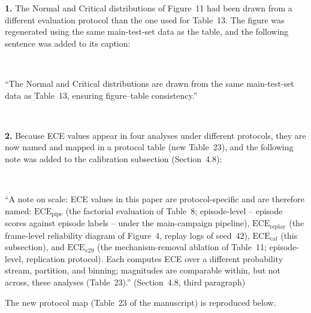 \documentclass[1p,12pt,authoryear]{elsarticle}
\begin{document}
\vspace{2mm}
\noindent \textbf{1.} The Normal and Critical distributions of Figure~11 had been drawn from a different evaluation protocol than the one used for Table~13. The figure was regenerated using the same main-test-set data as the table, and the following sentence was added to its caption:

~

``The Normal and Critical distributions are drawn from the same main-test-set data as Table~13, ensuring figure--table consistency.''

~

\noindent \textbf{2.} Because ECE values appear in four analyses under different protocols, they are now named and mapped in a protocol table (new Table~23), and the following note was added to the calibration subsection (Section~4.8):

~

``A note on scale: ECE values in this paper are protocol-specific and are therefore named: $\mathrm{ECE}_{\mathrm{pipe}}$ (the factorial evaluation of Table~8; episode-level -- episode scores against episode labels -- under the main-campaign pipeline), $\mathrm{ECE}_{\mathrm{replay}}$ (the frame-level reliability diagram of Figure~4, replay logs of seed~42), $\mathrm{ECE}_{\mathrm{cal}}$ (this subsection), and $\mathrm{ECE}_{\mathrm{v29}}$ (the mechanism-removal ablation of Table~11; episode-level, replication protocol). Each computes ECE over a different probability stream, partition, and binning; magnitudes are comparable within, but not across, these analyses (Table~23).'' (Section~4.8, third paragraph)

\noindent The new protocol map (Table~23 of the manuscript) is reproduced below.
\end{document}
